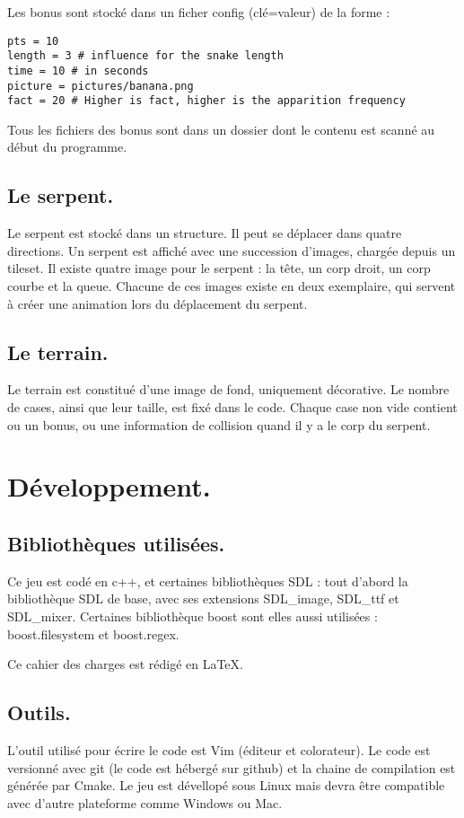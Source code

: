 \documentclass{article}
\begin{document}
Les bonus sont stocké dans un ficher config (clé=valeur) de la forme :
\begin{verbatim}
pts = 10
length = 3 # influence for the snake length
time = 10 # in seconds
picture = pictures/banana.png
fact = 20 # Higher is fact, higher is the apparition frequency
\end{verbatim}

Tous les fichiers des bonus sont dans un dossier dont le contenu est scanné au début du programme.

\subsection{Le serpent.}
Le serpent est stocké dans un structure. Il peut se déplacer dans quatre directions. Un serpent est affiché avec une succession d'images, chargée depuis un tileset. Il existe quatre image pour le serpent : la tête, un corp droit, un corp courbe et la queue. Chacune de ces images existe en deux exemplaire, qui servent à créer une animation lors du déplacement du serpent.

\subsection{Le terrain.}
Le terrain est constitué d'une image de fond, uniquement décorative. Le nombre de cases, ainsi que leur taille, est fixé dans le code. Chaque case non vide contient ou un bonus, ou une information de collision quand il y a le corp du serpent.

\section{Développement.}
\subsection{Bibliothèques utilisées.}
Ce jeu est codé en c++, et certaines bibliothèques SDL : tout d'abord la bibliothèque SDL de base, avec ses extensions SDL\_image, SDL\_ttf et SDL\_mixer. Certaines bibliothèque boost sont elles aussi utilisées : boost.filesystem et boost.regex.

Ce cahier des charges est rédigé en \LaTeX.

\subsection{Outils.}
L'outil utilisé pour écrire le code est Vim (éditeur et colorateur). Le code est versionné avec git (le code est hébergé sur github) et la chaine de compilation est générée par Cmake. Le jeu est dévellopé sous Linux mais devra être compatible avec d'autre plateforme comme Windows ou Mac.
\end{document}
